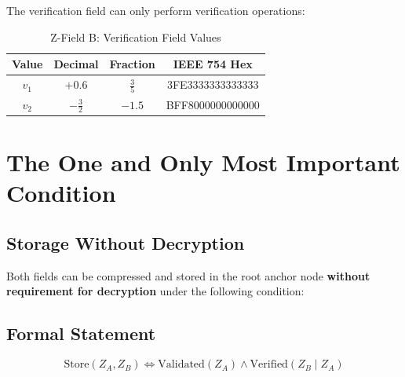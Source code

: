 \documentclass[12pt]{article}
\begin{document}
The verification field can only perform verification operations:

\begin{table}[h]
\centering
\begin{tabular}{|c|c|c|c|}
\hline
\textbf{Value} & \textbf{Decimal} & \textbf{Fraction} & \textbf{IEEE 754 Hex} \\
\hline
$v_1$ & $+0.6$ & $\frac{3}{5}$ & 3FE3333333333333 \\
\hline
$v_2$ & $-\frac{3}{2}$ & $-1.5$ & BFF8000000000000 \\
\hline
\end{tabular}
\caption{Z-Field B: Verification Field Values}
\end{table}

\section{The One and Only Most Important Condition}

\subsection{Storage Without Decryption}

Both fields can be compressed and stored in the root anchor node \textbf{without requirement for decryption} under the following condition:

\begin{center}
\end{center}

\subsection{Formal Statement}

\begin{equation}
\text{Store}(Z_A, Z_B) \iff \text{Validated}(Z_A) \land \text{Verified}(Z_B \mid Z_A)
\end{equation}
\end{document}
